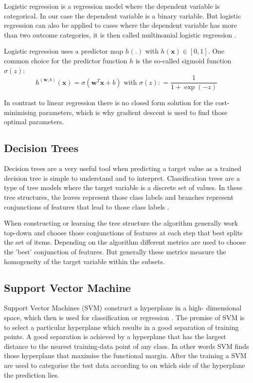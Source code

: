 \documentclass[a4paper,11pt]{article}
\begin{document}
Logistic regression is a regression model where the dependent variable is categorical. In our case the dependent variable is a binary variable. But logistic regression can also be applied to cases where the dependent variable has more than two outcome categories, it is then called multinomial logistic regression \cite{freedman2005statistical}.

Logistic regression uses a  predictor map $ h(.)$ with $h ( \mathbf { x } ) \in [ 0,1] $. One common choice for the predictor function $h$ is the so-called sigmoid function $ \sigma ( z ) $:
$$ h ^ { ( \mathbf { w } ,b ) } ( \mathbf { x } ) = \sigma \left( \mathbf { w } ^ { T } \mathbf { x } + b \right) \text{ with } \sigma ( z ) : = \frac{1}{1+ \exp ( - z )}  $$

In contrast to linear regression there is no closed form solution for the cost-minimising parameters, which is why gradient descent is used to find those optimal parameters.

\subsection*{Decision Trees}

Decision trees are a very useful tool when predicting a target value as a trained decision tree is simple to understand and to interpret. Classification trees are a type of tree models where the target variable is a discrete set of values. In these tree structures, the leaves represent those class labels and branches represent conjunctions of features that lead to those class labels \cite{Rokach:2014:DMD:2755359}.

When constructing or learning the tree structure the algorithm generally work top-down and choose those conjunctions of features at each step that best splits the set of items. Depending on the algorithm different metrics are used to choose the 'best' conjunction of features. But generally these metrics measure the homogeneity of the target variable within the subsets.

\subsection*{Support Vector Machine}

Support Vector Machines (SVM) construct a hyperplane in a high- dimensional space, which then is  used for classification or regression \cite{Cortes1995}. The premise of SVM is to select a particular hyperplane which results in a  good separation of training points. A good separation is achieved by a hyperplane that has the largest distance to the nearest training-data point of any class. In other words SVM finds those hyperplane that maximise the  functional margin. After the training a SVM are used to categorise the test data according to on which side of the hyperplane the prediction lies.
\end{document}
